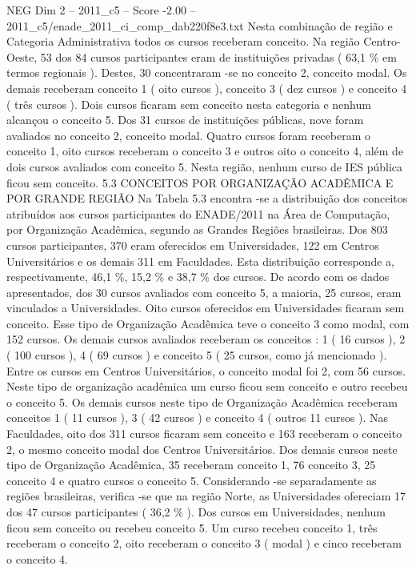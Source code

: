 \begin{textsample}{NEG Dim 2 – 2011\_c5 – Score -2.00 – 2011\_c5/enade\_2011\_ci\_comp\_dab220f8e3.txt}
Nesta combinação de região e Categoria Administrativa todos os cursos receberam conceito.
Na região Centro-Oeste, 53 dos 84 cursos participantes eram de instituições privadas ( 63,1 \% em termos regionais ).
Destes, 30 concentraram -se no conceito 2, conceito modal.
Os demais receberam conceito 1 ( oito cursos ), conceito 3 ( dez cursos ) e conceito 4 ( três cursos ).
Dois cursos ficaram sem conceito nesta categoria e nenhum alcançou o conceito 5.
Dos 31 cursos de instituições públicas, nove foram avaliados no conceito 2, conceito modal.
Quatro cursos foram receberam o conceito 1, oito cursos receberam o conceito 3 e outros oito o conceito 4, além de dois cursos avaliados com conceito 5.
Nesta região, nenhum curso de IES pública ficou sem conceito. 5.3 CONCEITOS POR ORGANIZAÇÃO ACADÊMICA E POR GRANDE REGIÃO Na Tabela 5.3 encontra -se a distribuição dos conceitos atribuídos aos cursos participantes do ENADE/2011 na Área de Computação, por Organização Acadêmica, segundo as Grandes Regiões brasileiras.
Dos 803 cursos participantes, 370 eram oferecidos em Universidades, 122 em Centros Universitários e os demais 311 em Faculdades.
Esta distribuição corresponde a, respectivamente, 46,1 \%, 15,2 \% e 38,7 \% dos cursos.
De acordo com os dados apresentados, dos 30 cursos avaliados com conceito 5, a maioria, 25 cursos, eram vinculados a Universidades.
Oito cursos oferecidos em Universidades ficaram sem conceito.
Esse tipo de Organização Acadêmica teve o conceito 3 como modal, com 152 cursos.
Os demais cursos avaliados receberam os conceitos : 1 ( 16 cursos ), 2 ( 100 cursos ), 4 ( 69 cursos ) e conceito 5 ( 25 cursos, como já mencionado ).
Entre os cursos em Centros Universitários, o conceito modal foi 2, com 56 cursos.
Neste tipo de organização acadêmica um curso ficou sem conceito e outro recebeu o conceito 5.
Os demais cursos neste tipo de Organização Acadêmica receberam conceitos 1 ( 11 cursos ), 3 ( 42 cursos ) e conceito 4 ( outros 11 cursos ).
Nas Faculdades, oito dos 311 cursos ficaram sem conceito e 163 receberam o conceito 2, o mesmo conceito modal dos Centros Universitários.
Dos demais cursos neste tipo de Organização Acadêmica, 35 receberam conceito 1, 76 conceito 3, 25 conceito 4 e quatro cursos o conceito 5.
Considerando -se separadamente as regiões brasileiras, verifica -se que na região Norte, as Universidades ofereciam 17 dos 47 cursos participantes ( 36,2 \% ).
Dos cursos em Universidades, nenhum ficou sem conceito ou recebeu conceito 5.
Um curso recebeu conceito 1, três receberam o conceito 2, oito receberam o conceito 3 ( modal ) e cinco receberam o conceito 4.

\end{textsample}
